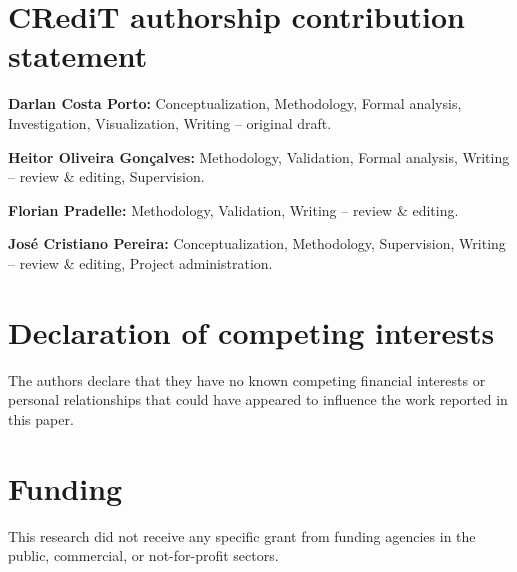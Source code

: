 \documentclass[preprint,12pt,a4paper]{elsarticle}
\let\oldsection\section
\renewcommand\section{\FloatBarrier\oldsection}
\begin{document}










\section*{CRediT authorship contribution statement}

\noindent\textbf{Darlan Costa Porto:} Conceptualization, Methodology, Formal analysis, Investigation, Visualization, Writing -- original draft.

\noindent\textbf{Heitor Oliveira Gon\c{c}alves:} Methodology, Validation, Formal analysis, Writing -- review \& editing, Supervision.

\noindent\textbf{Florian Pradelle:} Methodology, Validation, Writing -- review \& editing.

\noindent\textbf{Jos\'e Cristiano Pereira:} Conceptualization, Methodology, Supervision, Writing -- review \& editing, Project administration.


\section*{Declaration of competing interests}
The authors declare that they have no known competing financial interests
or personal relationships that could have appeared to influence the work
reported in this paper.

\section*{Funding}
This research did not receive any specific grant from funding agencies in
the public, commercial, or not-for-profit sectors.
\end{document}
